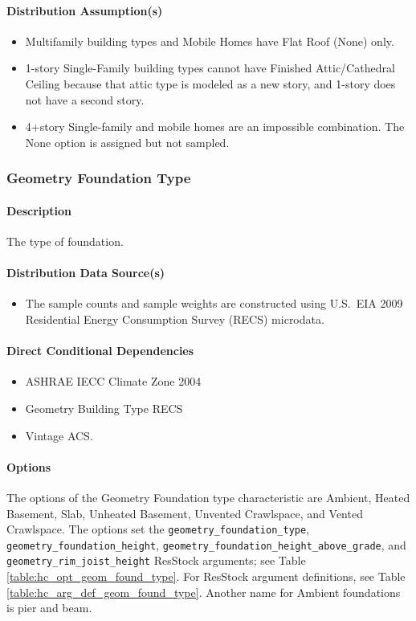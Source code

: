 \paragraph{Distribution Assumption(s)}
\begin{itemize}
    \item Multifamily building types and Mobile Homes have Flat Roof (None) only.
    \item 1-story Single-Family building types cannot have Finished Attic/Cathedral Ceiling because that attic type is modeled as a new story, and 1-story does not have a second story. 
    \item 4+story Single-family and mobile homes are an impossible combination. The None option is assigned but not sampled.
\end{itemize}

\subsubsection{Geometry Foundation Type} \label{geometry_foundation_type}
\paragraph{Description}
The type of foundation.

\paragraph{Distribution Data Source(s)}
\begin{itemize}
    \item The sample counts and sample weights are constructed using U.S.~EIA 2009 Residential Energy Consumption Survey (RECS) microdata.
\end{itemize}

\paragraph{Direct Conditional Dependencies}
\begin{itemize}
    \item ASHRAE IECC Climate Zone 2004
    \item Geometry Building Type RECS
    \item Vintage ACS.
\end{itemize}

\paragraph{Options}
The options of the Geometry Foundation type characteristic are Ambient, Heated Basement, Slab, Unheated Basement, Unvented Crawlspace, and Vented Crawlspace. The options set the \texttt{geometry\_foundation\_type}, \texttt{geometry\_foundation\_height}, \texttt{geometry\_foundation\_height\_above\_grade}, and \texttt{geometry\_rim\_joist\_height} ResStock arguments; see Table \ref{table:hc_opt_geom_found_type}. For ResStock argument definitions, see Table \ref{table:hc_arg_def_geom_found_type}. Another name for Ambient foundations is pier and beam.

